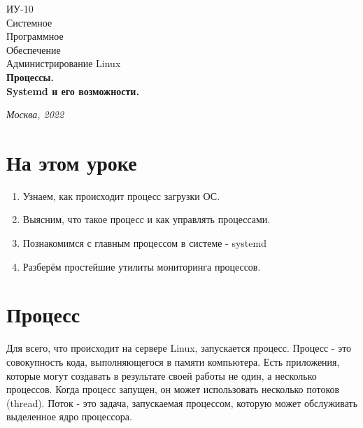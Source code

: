 \documentclass[14pt, a4paper]{article}
\begin{document}
\begin{titlepage}
    \topmargin=216pt
    \newpage
    \hangindent=0.7cm
    \huge ИУ-10\\
    Системное\\
    Программное\\
    Обеспечение\\
    Администрирование Linux\\
    \textbf{Процессы.\\
    Systemd и его возможности.}

    \vspace{9cm}

    \begin{center}
        \small\textit{Москва, 2022}
    \end{center}
\end{titlepage}

\section*{На этом уроке} 

\begin{enumerate}
    \item Узнаем, как происходит процесс загрузки ОС.
    \item Выясним, что такое процесс и как управлять процессами.
    \item Познакомимся с главным процессом в системе - systemd
    \item Разберём простейшие утилиты мониторинга процессов.
\end{enumerate}


\tableofcontents
\newpage

\section*{Процесс} 

Для всего, что происходит на сервере Linux, запускается процесс. Процесс - это совокупность кода,
выполняющегося в памяти компьютера. Есть приложения, которые могут создавать в результате
своей работы не один, а несколько процессов. Когда процесс запущен, он может использовать
несколько потоков (thread). Поток - это задача, запускаемая процессом, которую может обслуживать
выделенное ядро процессора.\\
\end{document}
